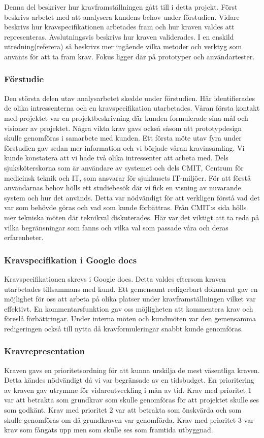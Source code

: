 \documentclass{article}
\begin{document}
Denna del beskriver hur kravframställningen gått till i detta projekt. Först beskrivs arbetet med att analysera kundens behov under förstudien. Vidare beskrivs hur kravspecifikationen arbetades fram och hur kraven valdes att representeras. Avslutningsvis beskrivs hur kraven validerades. I en enskild utredning(referera) så beskrivs mer ingående vilka metoder och verktyg som använts för att ta fram krav. Fokus ligger där på prototyper och användartester.

\subsubsection{Förstudie}
Den största delen utav analysarbetet skedde under förstudien. Här identifierades de olika intressenterna och en kravspecifikation utarbetades. Våran första kontakt med projektet var en projektbeskrivning där kunden formulerade sina mål och visioner av projektet. Några vikta krav gavs också såsom att prototypdesign skulle genomföras i samarbete med kunden. Ett första möte utav fyra under förstudien gav sedan mer information och vi började våran kravinsamling. Vi kunde konstatera att vi hade två olika intressenter att arbeta med. Dels sjuksköterskorna som är användare av systemet och dels CMIT, Centrum för medicinsk teknik och IT, som ansvarar för sjukhusets IT-miljöer. För att förstå användarnas behov hölls ett studiebesök där vi fick en visning av nuvarande system och hur det används. Detta var nödvändigt för att verkligen förstå vad det var som behövde göras och vad som kunde förbättras. Från CMIT:s sida hölls mer tekniska möten där teknikval diskuterades. Här var det viktigt att ta reda på vilka begränsningar som fanns och vilka val som passade våra och deras erfarenheter.

\subsubsection{Kravspecifikation i Google docs}
Kravspecifikationen skrevs i Google docs. Detta valdes eftersom kraven utarbetades tillsammans med kund. Ett gemensamt redigerbart dokument gav en möjlighet för oss att arbeta på olika platser under kravframställningen vilket var effektivt. En kommentarsfunktion gav oss möjligheten att kommentera krav och föreslå förbättringar. Under interna möten och kundmöten var den gemensamma redigeringen också till nytta då kravformuleringar snabbt kunde genomföras.

\subsubsection{Kravrepresentation}
Kraven gavs en prioritetsordning för att kunna urskilja de mest väsentliga kraven. Detta kändes nödvändigt då vi var begränsade av en tidsbudget. En prioritering av kraven gav utrymme för vidareutveckling i mån av tid. Krav med prioritet 1 var att betrakta som grundkrav som skulle genomföras för att projektet skulle ses som godkänt. Krav med prioritet 2 var att betrakta som önskvärda och som skulle genomföras om då grundkraven var genomförda. Krav med prioritet 3 var krav som fångats upp men som skulle ses som framtida utbyggnad. 
\end{document}
